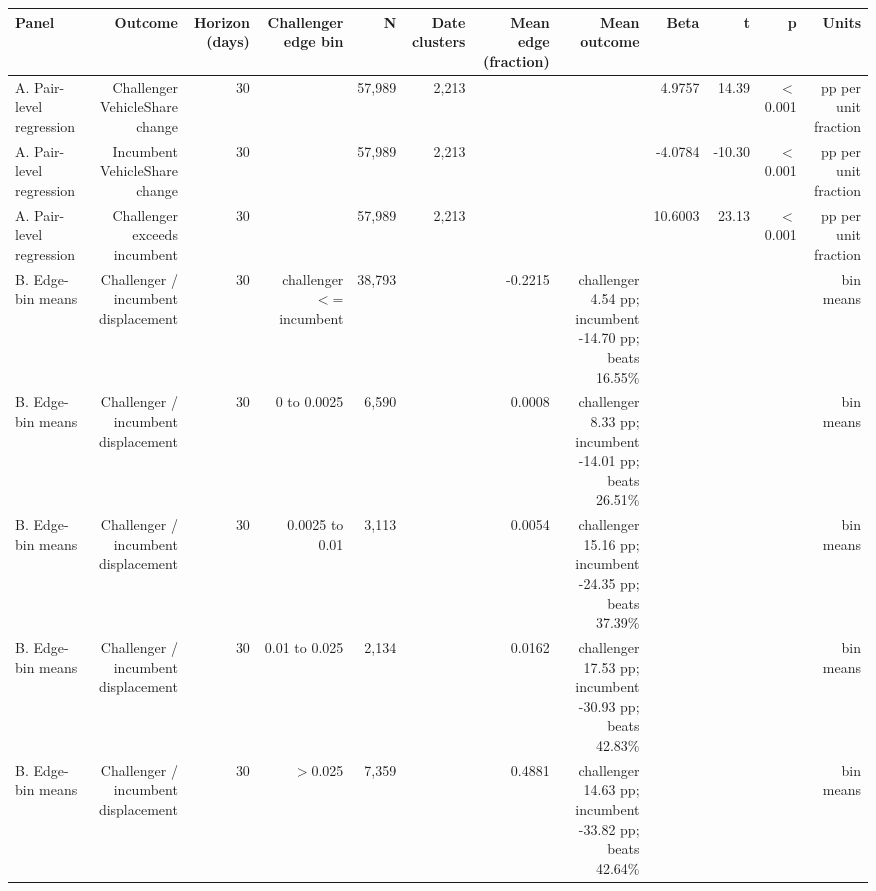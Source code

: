 \begin{tabular}{lrrrrrrrrrrr}
\toprule
Panel & Outcome & Horizon (days) & Challenger edge bin & N & Date clusters & Mean edge (fraction) & Mean outcome & Beta & t & p & Units \\
\midrule
A. Pair-level regression & Challenger VehicleShare change & 30 &  & 57,989 & 2,213 &  &  & 4.9757 & 14.39 & \ensuremath{<}0.001 & pp per unit fraction \\
A. Pair-level regression & Incumbent VehicleShare change & 30 &  & 57,989 & 2,213 &  &  & -4.0784 & -10.30 & \ensuremath{<}0.001 & pp per unit fraction \\
A. Pair-level regression & Challenger exceeds incumbent & 30 &  & 57,989 & 2,213 &  &  & 10.6003 & 23.13 & \ensuremath{<}0.001 & pp per unit fraction \\
B. Edge-bin means & Challenger / incumbent displacement & 30 & challenger \ensuremath{<}= incumbent & 38,793 &  & -0.2215 & challenger 4.54 pp; incumbent -14.70 pp; beats 16.55\% &  &  &  & bin means \\
B. Edge-bin means & Challenger / incumbent displacement & 30 & 0 to 0.0025 & 6,590 &  & 0.0008 & challenger 8.33 pp; incumbent -14.01 pp; beats 26.51\% &  &  &  & bin means \\
B. Edge-bin means & Challenger / incumbent displacement & 30 & 0.0025 to 0.01 & 3,113 &  & 0.0054 & challenger 15.16 pp; incumbent -24.35 pp; beats 37.39\% &  &  &  & bin means \\
B. Edge-bin means & Challenger / incumbent displacement & 30 & 0.01 to 0.025 & 2,134 &  & 0.0162 & challenger 17.53 pp; incumbent -30.93 pp; beats 42.83\% &  &  &  & bin means \\
B. Edge-bin means & Challenger / incumbent displacement & 30 & \ensuremath{>}0.025 & 7,359 &  & 0.4881 & challenger 14.63 pp; incumbent -33.82 pp; beats 42.64\% &  &  &  & bin means \\
\bottomrule
\end{tabular}
